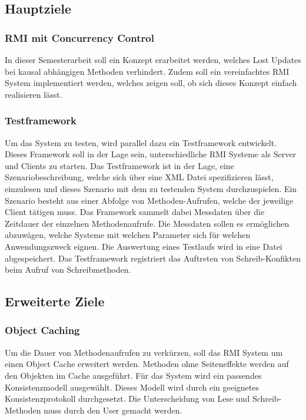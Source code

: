 \documentclass{article}
\begin{document}
\subsection{Hauptziele}
\label{sec:hauptziele}

\subsubsection{RMI mit Concurrency Control}
\label{sec:rmi-mit-concurrency}

In dieser Semesterarbeit soll ein Konzept erarbeitet werden, welches Lost Updates bei kausal abhängigen Methoden verhindert.  Zudem soll ein vereinfachtes RMI System implementiert werden, welches zeigen soll, ob sich dieses Konzept einfach realisieren lässt.

\subsubsection{Testframework}
\label{sec:testframework}

Um das System zu testen, wird parallel dazu ein Testframework entwickelt. Dieses Framework soll in der Lage sein, unterschiedliche RMI Systeme als Server und Clients zu starten. Das Testframework ist in der Lage, eine Szenariobeschreibung, welche sich über eine XML Datei spezifizieren lässt, einzulesen und dieses Szenario mit dem zu testenden System durchzuspielen. Ein Szenario besteht aus einer Abfolge von Methoden-Aufrufen, welche der jeweilige Client tätigen muss. Das Framework sammelt dabei Messdaten über die Zeitdauer der einzelnen Methodenaufrufe. Die Messdaten sollen es ermöglichen abzuwägen, welche Systeme mit welchen Parameter sich für welchen Anwendungszweck eignen. Die Auswertung eines Testlaufs wird in eine Datei abgespeichert. Das Testframework registriert das Auftreten von Schreib-Konfikten beim Aufruf von Schreibmethoden. 

\subsection{Erweiterte Ziele}
\label{sec:erweiterte-ziele}

\subsubsection{Object Caching}
\label{sec:object-caching}

Um die Dauer von Methodenaufrufen zu verkürzen, soll das RMI System um einen Object Cache erweitert werden. Methoden ohne Seiteneffekte werden auf den Objekten im Cache ausgeführt. Für das System wird ein passendes Konsistenzmodell ausgewählt. Dieses Modell wird durch ein geeignetes Konsistenzprotokoll durchgesetzt. Die Unterscheidung von Lese und Schreib- Methoden muss durch den User gemacht werden.
\end{document}
